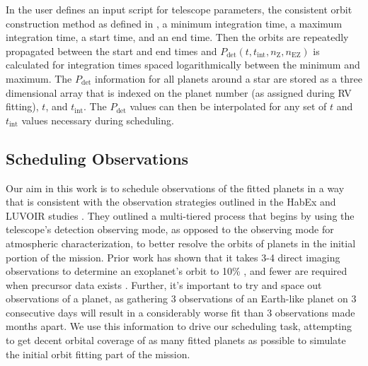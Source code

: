 
In  the user defines an  input script for
telescope parameters, the consistent orbit construction method as defined in
, a minimum integration time, a maximum integration time,
a start time, and an end time. Then the orbits are repeatedly propagated
between the start and end times and $P_{\textrm{det}}(t, t_{\textrm{int}},
n_\textrm{Z}, n_\textrm{EZ})$ is calculated for integration times spaced
logarithmically between the minimum and maximum. The $P_{\textrm{det}}$
information for all planets around a star are stored as a three dimensional
array that is indexed on the planet number (as assigned during RV fitting),
$t$, and $t_{\textrm{int}}$. The $P_\textrm{det}$ values can then be
interpolated for any set of $t$ and $t_\textrm{int}$ values necessary during
scheduling.

\subsection{Scheduling Observations}
\label{sub:scheduling}

Our aim in this work is to schedule observations of the fitted planets in a way
that is consistent with the observation strategies outlined in the HabEx and
LUVOIR studies \cite{gaudiHabitableExoplanetObservatory2020,TheLUVOIRTeam2019}.
They outlined a multi-tiered process that begins by using the telescope's
detection observing mode, as opposed to the observing mode for atmospheric
characterization, to better resolve the orbits of planets in the initial
portion of the mission. Prior work has shown that it takes 3-4 direct imaging
observations to determine an exoplanet's orbit to 10\%
\citep{bluntOrbitsImpatient2017}, and fewer are required when precursor data
exists \citep{gaudiHabitableExoplanetObservatory2020}. Further, it's important
to try and space out observations of a planet, as gathering 3 observations of
an Earth-like planet on 3 consecutive days will result in a considerably worse
fit than 3 observations made months apart. We use this information to drive our
scheduling task, attempting to get decent orbital coverage of as many fitted
planets as possible to simulate the initial orbit fitting part of the mission.

